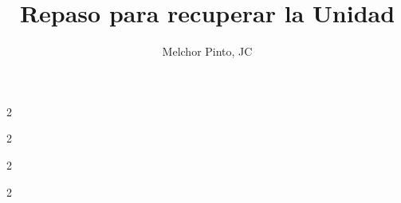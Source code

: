 \documentclass[12pt,addpoints]{repaso}
\title{Repaso para {\color{brown}recuperar} la Unidad}
\author{Melchor Pinto, JC}
\begin{document}
%
\begin{questions}
    \questionboxed[5]{}

    \questionboxed[4]{}
    \questionboxed[4]{}


    \newpage

    \begin{multicols}{2}
    \questionboxed[5]{}
    \questionboxed[5]{}
    \end{multicols}

    \begin{multicols}{2}
    \questionboxed[5]{}
    \questionboxed[5]{}
    \end{multicols}  

    \newpage

    \begin{multicols}{2}
        \questionboxed[5]{}
        \questionboxed[5]{}
    \end{multicols}
    \questionboxed[8]{}
    \questionboxed[5]{}
    \questionboxed[5]{}
    \begin{multicols}{2}
        \questionboxed[15]{}
        \questionboxed[15]{}
    \end{multicols}
    \questionboxed[5]{}
    \questionboxed[4]{}

\end{questions}
\begin{landscape}
    \begin{minipage}[b]{\textwidth}
        \thispagestyle{foot}
        \begin{table}[H]
            \centering
            \caption{Tabla Peri\'odica de los Elementos.}
            \TablaPeriodica[0.48]
            \label{tab:periodic_table}
        \end{table}
    \end{minipage}
\end{landscape}
\end{document}
